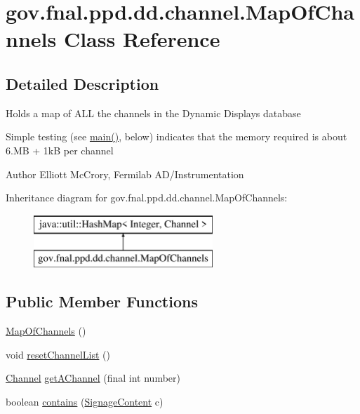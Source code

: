 \hypertarget{classgov_1_1fnal_1_1ppd_1_1dd_1_1channel_1_1MapOfChannels}{\section{gov.\-fnal.\-ppd.\-dd.\-channel.\-Map\-Of\-Channels Class Reference}
\label{classgov_1_1fnal_1_1ppd_1_1dd_1_1channel_1_1MapOfChannels}
}


\subsection{Detailed Description}
Holds a map of A\-L\-L the channels in the Dynamic Displays database

Simple testing (see \hyperlink{classgov_1_1fnal_1_1ppd_1_1dd_1_1channel_1_1MapOfChannels_a2e3cd81fac45f2de2333d26dc534b699}{main()}, below) indicates that the memory required is about 6.\-M\-B + 1k\-B per channel

\begin{DoxyAuthor}{Author}
Elliott Mc\-Crory, Fermilab A\-D/\-Instrumentation 
\end{DoxyAuthor}
Inheritance diagram for gov.\-fnal.\-ppd.\-dd.\-channel.\-Map\-Of\-Channels\-:\begin{figure}[H]
\begin{center}
\leavevmode
\includegraphics[height=2.000000cm]{classgov_1_1fnal_1_1ppd_1_1dd_1_1channel_1_1MapOfChannels}
\end{center}
\end{figure}
\subsection*{Public Member Functions}
\begin{DoxyCompactItemize}
\item 
\hyperlink{classgov_1_1fnal_1_1ppd_1_1dd_1_1channel_1_1MapOfChannels_a50904afe8dc2195a5bdc156efc32e065}{Map\-Of\-Channels} ()
\item 
void \hyperlink{classgov_1_1fnal_1_1ppd_1_1dd_1_1channel_1_1MapOfChannels_a2631777fd0adabe06c3c3941190e4e0b}{reset\-Channel\-List} ()
\item 
\hyperlink{interfacegov_1_1fnal_1_1ppd_1_1dd_1_1signage_1_1Channel}{Channel} \hyperlink{classgov_1_1fnal_1_1ppd_1_1dd_1_1channel_1_1MapOfChannels_a1fe019368302baecc21d10cf1def241a}{get\-A\-Channel} (final int number)
\item 
boolean \hyperlink{classgov_1_1fnal_1_1ppd_1_1dd_1_1channel_1_1MapOfChannels_abc6f10d676361ad8d26cb8e6a581cc31}{contains} (\hyperlink{interfacegov_1_1fnal_1_1ppd_1_1dd_1_1signage_1_1SignageContent}{Signage\-Content} c)
\end{DoxyCompactItemize}
